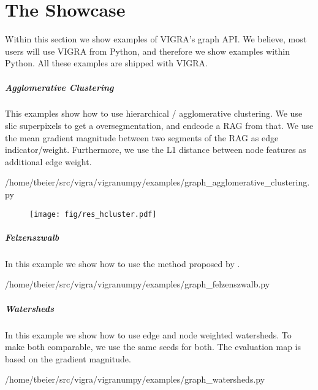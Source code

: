 \flushleft
\chapter{The Showcase}\label{ch:the_showcase} 

Within this section we show examples of VIGRA's
graph API. We believe, most users will use
VIGRA from Python, and therefore we show examples
within Python.
All these examples are shipped with  VIGRA.


\newpage
\paragraph{Agglomerative Clustering}
This examples show how to use  hierarchical /  agglomerative clustering.
We use slic superpixels \citep{achanta_2012_pami}
to get a oversegmentation, and endcode a RAG from that.
We use the mean gradient magnitude between two segments 
of the RAG
as edge indicator/weight.
Furthermore, we use the L1 distance between node features
as additional edge weight.




{/home/tbeier/src/vigra/vigranumpy/examples/graph_agglomerative_clustering.py}
\begin{figure}
\centering
\texttt{[image: fig/res\_hcluster.pdf]}
\end{figure}


%

\paragraph{Felzenszwalb}
In this example we show how to use the method 
proposed by \citet{felzenszwalb_2004_ijcv}.

{/home/tbeier/src/vigra/vigranumpy/examples/graph_felzenszwalb.py}

\paragraph{Watersheds}
In this example we show how to use edge and node weighted
watersheds.
To make both comparable, we use the same seeds for both.
The evaluation map is based on the gradient magnitude.


{/home/tbeier/src/vigra/vigranumpy/examples/graph_watersheds.py}